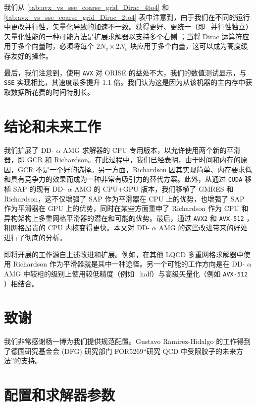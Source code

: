 \documentclass[5p,times,a4paper,fleqn]{cas-dc}
\begin{document}
我们从    \ref{tab:avx_vs_sse_coarse_grid_Dirac_4to4}    和    \ref{tab:avx_vs_sse_coarse_grid_Dirac_2to4}    表中注意到，由于我们在不同的运行中更改并行性，矢量化导致的加速不一致。获得更好、更统一（即 \  并行性独立）矢量化性能的一种可能方法是扩展求解器以支持多个右侧    \cite{yamamoto2022implementation}    ；当将 Dirac 运算符应用于多个向量时，必须将每个    $2N_{v} \times 2N_{v}$    块应用于多个向量，这可以成为高度缓存友好的操作。  

最后，我们注意到，使用    \texttt{AVX}    对 ORISE 的益处不大，我们的数值测试显示，与    \texttt{SSE}    实现相比，其速度最多提升 1.1 倍。我们认为这是因为从该机器的主内存中获取数据所花费的时间特别长。  

   \section{结论和未来工作  }       \label{sect:conclusions_and_future_work}     

我们扩展了 DD-    $\alpha$    AMG 求解器的 CPU 专用版本，以允许使用两个新的平滑器，即 GCR 和 Richardson。在此过程中，我们已经表明，由于时间和内存的原因，GCR 不是一个好的选择。另一方面，Richardson 因其实现简单、内存要求低和具有竞争力的效果而成为一种非常有吸引力的替代方案。此外，从通过    \texttt{CUDA}    移植 SAP 的现有 DD-    $\alpha$    AMG 的 CPU+GPU 版本，我们移植了 GMRES 和 Richardson，这不仅增强了 SAP 作为平滑器在 CPU 上的优势，也增强了 SAP 作为平滑器在 GPU 上的优势，同时在某些方面重申了 Richardson 作为 CPU 和异构架构上多重网格平滑器的潜在和可能的优势。最后，通过    \texttt{AVX2}    和    \texttt{AVX-512}    ，粗网格昂贵的 CPU 内核变得更快。本文对 DD-   $\alpha$    AMG 的这些改进带来的好处进行了彻底的分析。  

即将开展的工作源自上述改进和扩展。例如，在其他 LQCD 多重网格求解器中使用 Richardson 作为平滑器就是其中一种途径。另一个可能的工作方向是在 DD-   $\alpha$    AMG 中较粗的级别上使用较低精度（例如 \  half）与高级矢量化（例如    \texttt{AVX-512}   ）相结合。  

   \section{致谢  }    我们非常感谢杨一博为我们提供规范配置。Gustavo Ramirez-Hidalgo 的工作得到了德国研究基金会 (DFG) 研究部门 FOR5269“研究 QCD 中受限胶子的未来方法”的支持。  

   \appendix     

   \section{配置和求解器参数  }     
\end{document}
